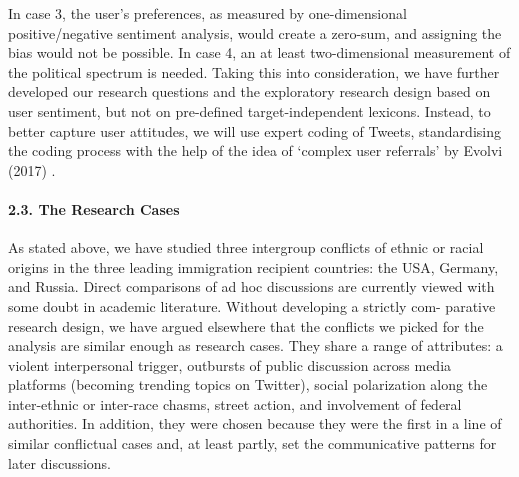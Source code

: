 In case 3, the user’s preferences, as measured by one-dimensional positive/negative sentiment analysis, would create a zero-sum, and assigning the bias would not be possible. In case 4, an at least two-dimensional measurement of the political spectrum is needed. Taking this into consideration, we have further developed our research questions and the exploratory research design based on user sentiment, but not on pre-defined target-independent lexicons. Instead, to better capture user attitudes, we will use expert coding of Tweets, standardising the coding process with the help of the idea of ‘complex user referrals’ by Evolvi (2017) \cite{Evolvi}.

\paragraph{2.3. The Research Cases}

As stated above, we have studied three intergroup conflicts of ethnic or racial origins in the three leading immigration recipient countries: the USA, Germany, and Russia. Direct comparisons of ad hoc discussions \cite{BrunsBurgess} are currently viewed with some doubt in academic literature. Without developing a strictly com- parative research design, we have argued elsewhere \cite{BodrunovaLitvinenkoBlekanov2017,BodrunovaBlekanovMaksimov} that the conflicts we picked for the analysis are similar enough as research cases. They share a range of attributes: a violent interpersonal trigger, outbursts of public discussion across media platforms (becoming trending topics on Twitter), social polarization along the inter-ethnic or inter-race chasms, street action, and involvement of federal authorities. In addition, they were chosen because they were the first in a line of similar conflictual cases and, at least partly, set the communicative patterns for later discussions.

